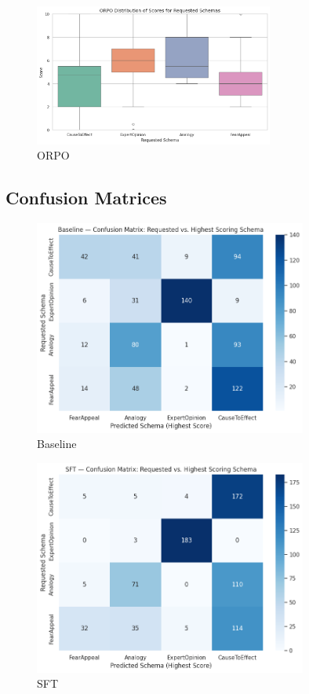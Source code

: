 \documentclass[11pt]{article}
\begin{document}
\begin{figure}[H]
  \centering
  \includegraphics[width=0.7\textwidth]{images/orpo_dis.png}
    \caption{ORPO}
\end{figure}

\subsection{Confusion Matrices}
\label{sub: confusion matrices}
\begin{figure}[H]
  \centering
  \includegraphics[width=0.8\textwidth]{images/base_conf.png}
    \caption{Baseline}
\end{figure}
\begin{figure}[H]
  \centering
  \includegraphics[width=0.8\textwidth]{images/sft_conf.png}
    \caption{SFT}
\end{figure}
\end{document}
